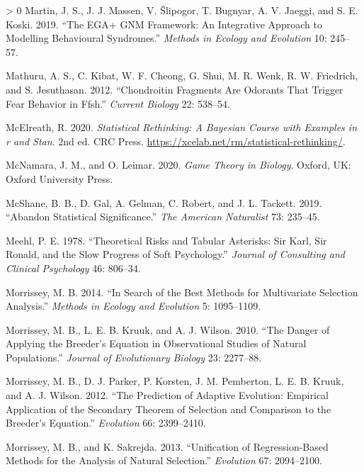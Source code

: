 \documentclass{article}
\newlength{\cslhangindent}
\newenvironment{CSLReferences}[3] %
 {%
  \setlength{\parindent}{0pt}
  \ifodd #1 \everypar{\setlength{\hangindent}{\cslhangindent}}\ignorespaces\fi
  \ifnum #2 > 0
  \setlength{\parskip}{#2\baselineskip}
  \fi
 }%
 {}
\begin{document}
\begin{CSLReferences}{1}{0}
\leavevmode\hypertarget{ref-Martin2019}{}%
Martin, J. S., J. J. Massen, V. Šlipogor, T. Bugnyar, A. V. Jaeggi, and
S. E. Koski. 2019. {``The EGA+ GNM Framework: An Integrative Approach to
Modelling Behavioural Syndromes.''} \emph{Methods in Ecology and
Evolution} 10: 245--57.

\leavevmode\hypertarget{ref-Mathuru2012}{}%
Mathuru, A. S., C. Kibat, W. F. Cheong, G. Shui, M. R. Wenk, R. W.
Friedrich, and S. Jesuthasan. 2012. {``Chondroitin Fragments Are
Odorants That Trigger Fear Behavior in Ffsh.''} \emph{Current Biology}
22: 538--54.

\leavevmode\hypertarget{ref-Rethinking}{}%
McElreath, R. 2020. \emph{Statistical Rethinking: A Bayesian Course with
Examples in r and Stan}. 2nd ed. CRC Press.
\url{https://xcelab.net/rm/statistical-rethinking/}.

\leavevmode\hypertarget{ref-McNamara2020}{}%
McNamara, J. M., and O. Leimar. 2020. \emph{Game Theory in Biology}.
Oxford, UK: Oxford University Press.

\leavevmode\hypertarget{ref-McShane2019}{}%
McShane, B. B., D. Gal, A. Gelman, C. Robert, and J. L. Tackett. 2019.
{``Abandon Statistical Significance.''} \emph{The American Naturalist}
73: 235--45.

\leavevmode\hypertarget{ref-Meehl1978}{}%
Meehl, P. E. 1978. {``Theoretical Risks and Tabular Asterisks: Sir Karl,
Sir Ronald, and the Slow Progress of Soft Psychology.''} \emph{Journal
of Consulting and Clinical Psychology} 46: 806--34.

\leavevmode\hypertarget{ref-Morrissey2014}{}%
Morrissey, M. B. 2014. {``In Search of the Best Methods for Multivariate
Selection Analysis.''} \emph{Methods in Ecology and Evolution} 5:
1095--1109.

\leavevmode\hypertarget{ref-Morrissey2010}{}%
Morrissey, M. B., L. E. B. Kruuk, and A. J. Wilson. 2010. {``The Danger
of Applying the Breeder's Equation in Observational Studies of Natural
Populations.''} \emph{Journal of Evolutionary Biology} 23: 2277--88.

\leavevmode\hypertarget{ref-Morrissey2012}{}%
Morrissey, M. B., D. J. Parker, P. Korsten, J. M. Pemberton, L. E. B.
Kruuk, and A. J. Wilson. 2012. {``The Prediction of Adaptive Evolution:
Empirical Application of the Secondary Theorem of Selection and
Comparison to the Breeder's Equation.''} \emph{Evolution} 66:
2399--2410.

\leavevmode\hypertarget{ref-Morrissey2013}{}%
Morrissey, M. B., and K. Sakrejda. 2013. {``Unification of
Regression-Based Methods for the Analysis of Natural Selection.''}
\emph{Evolution} 67: 2094--2100.


\end{CSLReferences}
\end{document}
